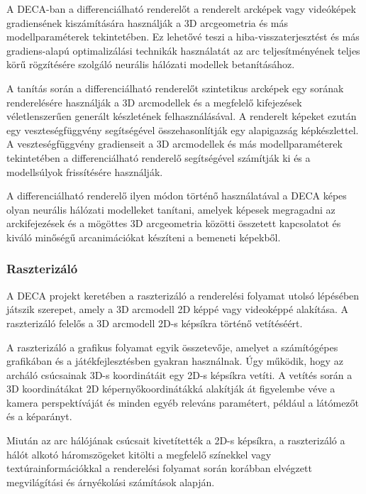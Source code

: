 \documentclass[12pt,a4]{article}
\begin{document}
                A DECA-ban a differenciálható renderelőt a renderelt arcképek vagy videóképek gradiensének kiszámítására használják a 3D arcgeometria és más modellparaméterek tekintetében. Ez lehetővé teszi a hiba-visszaterjesztést és más gradiens-alapú optimalizálási technikák használatát az arc teljesítményének teljes körű rögzítésére szolgáló neurális hálózati modellek betanításához.

                A tanítás során a differenciálható renderelőt szintetikus arcképek egy sorának renderelésére használják a 3D arcmodellek és a megfelelő kifejezések véletlenszerűen generált készletének felhasználásával. A renderelt képeket ezután egy veszteségfüggvény segítségével összehasonlítják egy alapigazság képkészlettel. A veszteségfüggvény gradienseit a 3D arcmodellek és más modellparaméterek tekintetében a differenciálható renderelő segítségével számítják ki és a modellsúlyok frissítésére használják.
                
                A differenciálható renderelő ilyen módon történő használatával a DECA képes olyan neurális hálózati modelleket tanítani, amelyek képesek megragadni az arckifejezések és a mögöttes 3D arcgeometria közötti összetett kapcsolatot és kiváló minőségű arcanimációkat készíteni a bemeneti képekből.

            \subsubsection{Raszterizáló}

                A DECA projekt keretében a raszterizáló a renderelési folyamat utolsó lépésében játszik szerepet, amely a 3D arcmodell 2D képpé vagy videoképpé alakítása. A raszterizáló felelős a 3D arcmodell 2D-s képsíkra történő vetítéséért.

                A raszterizáló a grafikus folyamat egyik összetevője, amelyet a számítógépes grafikában és a játékfejlesztésben gyakran használnak. Úgy működik, hogy az archáló csúcsainak 3D-s koordinátáit egy 2D-s képsíkra vetíti. A vetítés során a 3D koordinátákat 2D képernyőkoordinátákká alakítják át figyelembe véve a kamera perspektíváját és minden egyéb releváns paramétert, például a látómezőt és a képarányt.
                
                Miután az arc hálójának csúcsait kivetítették a 2D-s képsíkra, a raszterizáló a hálót alkotó háromszögeket kitölti a megfelelő színekkel vagy textúrainformációkkal a renderelési folyamat során korábban elvégzett megvilágítási és árnyékolási számítások alapján.
                
\end{document}
